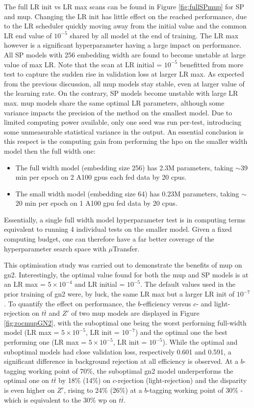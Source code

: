 The full LR init vs LR max scans can be found in Figure \ref{fig:fullSPmup} for SP and \gls{mup}. Changing the LR init has little effect on the reached performance, due to the LR scheduler quickly moving away from the initial value and the common LR end value of $10^{-5}$ shared by all model at the end of training. The LR max however is a significant hyperparameter having a large impact on performance. All SP models with 256 embedding width are found to become unstable at large value of max LR. Note that the scan at LR initial = $10^{-5}$ benefitted from more test to capture the sudden rise in validation loss at larger LR max. As expected from the previous discussion, all \gls{mup} models stay stable, even at larger value of the learning rate. On the contrary, SP models become unstable with large LR max. \gls{mup} models share the same optimal LR parameters, although some variance impacts the precision of the method on the smallest model. Due to limited computing power available, only one seed was run per-test, introducing some unmeasurable statistical variance in the output. An essential conclusion is this respect is the computing gain from performing the \gls{hpo} on the smaller width model then the full width one:
\begin{itemize}
  \item The full width model (embedding size 256) has 2.3M parameters, taking $\sim$39 min per epoch on 2 A100 \gls{gpu}s each fed data by 20 \gls{cpu}s.
  \item The small width model (embedding size 64) has 0.23M parameters, taking $\sim$20 min per epoch on 1 A100 \gls{gpu} fed data by 20 \gls{cpu}s.
\end{itemize}
Essentially, a single full width model hyperparameter test is in computing terms equivalent to running 4 individual tests on the smaller model. Given a fixed computing budget, one can therefore have a far better coverage of the hyperparameter search space with $\mu$Transfer.

This optimisation study was carried out to demonstrate the benefits of \gls{mup} on \gls{gn2}. Interestingly, the optimal value found for both the \gls{mup} and SP models is at an LR max = $5 \times 10^{-4}$ and LR initial = $10^{-5}$. The default values used in the prior training of \gls{gn2} were, by luck, the same LR max but a larger LR init of $10^{-7}$. To quantify the effect on performance, the $b$-efficiency versus $c$- and light-rejection on $t\bar{t}$ and $Z'$ of two \gls{mup} models are displayed in Figure \ref{fig:rocmupGN2}, with the suboptimal one being the worst performing full-width model (LR max = $5 \times 10^{-5}$, LR init = $10^{-7}$) and the optimal one the best performing one (LR max = $5\times 10^{-5}$, LR init = $10^{-5}$). While the optimal and suboptimal models had close validation loss, respectively 0.601 and 0.591, a significant difference in background rejection at all efficiency is observed. At a $b$-tagging working point of 70\%, the suboptimal \gls{gn2} model underperforms the optimal one on $t\bar{t}$ by 18\% (14\%) on $c$-rejection (light-rejection) and the disparity is even higher on $Z'$, rising to 24\% (26\%) at a $b$-tagging working point of 30\% - which is equivalent to the 30\% \gls{wp} on $t\bar{t}$.

